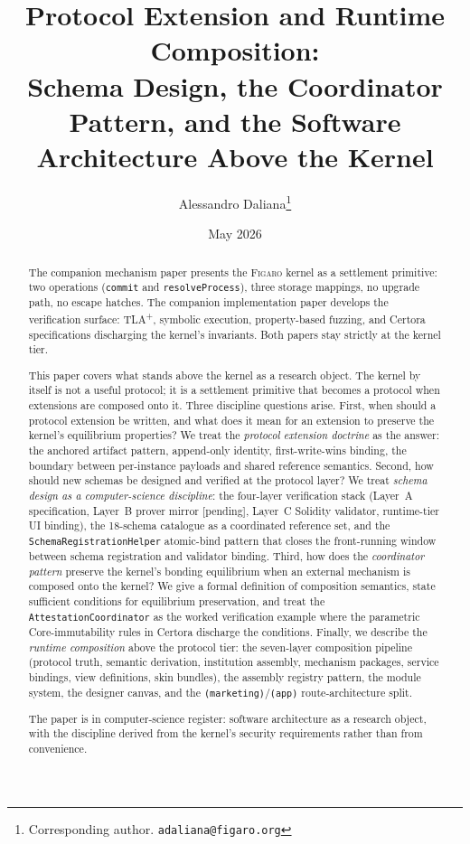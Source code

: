 \documentclass[11pt,a4paper]{article}
\title{%
  Protocol Extension and Runtime Composition:\\
  Schema Design, the Coordinator Pattern, and the Software Architecture
  Above the Kernel%
}
\author{
  Alessandro Daliana\thanks{Corresponding author. \texttt{adaliana@figaro.org}}
}
\date{May 2026}
\theoremstyle{definition}
\theoremstyle{remark}
\newcommand{\figaro}{\textsc{Figaro}}
\begin{document}
\maketitle

\begin{abstract}
The companion mechanism paper presents the \figaro{} kernel as a
settlement primitive: two operations (\texttt{commit} and
\texttt{resolveProcess}), three storage mappings, no upgrade path, no
escape hatches. The companion implementation paper develops the
verification surface: TLA\textsuperscript{+}, symbolic execution,
property-based fuzzing, and Certora specifications discharging the
kernel's invariants. Both papers stay strictly at the kernel tier.

This paper covers what stands above the kernel as a research object.
The kernel by itself is not a useful protocol; it is a settlement
primitive that becomes a protocol when extensions are composed onto
it. Three discipline questions arise. First, when should a protocol
extension be written, and what does it mean for an extension to
preserve the kernel's equilibrium properties? We treat the
\emph{protocol extension doctrine} as the answer: the anchored
artifact pattern, append-only identity, first-write-wins binding,
the boundary between per-instance payloads and shared reference
semantics. Second, how should new schemas be designed and verified
at the protocol layer? We treat \emph{schema design as a computer-science
discipline}: the four-layer verification stack (Layer~A
specification, Layer~B prover mirror [pending], Layer~C Solidity
validator, runtime-tier UI binding), the 18-schema catalogue as a
coordinated reference set, and the \texttt{SchemaRegistrationHelper}
atomic-bind pattern that closes the front-running window between
schema registration and validator binding. Third, how does the
\emph{coordinator pattern} preserve the kernel's bonding equilibrium
when an external mechanism is composed onto the kernel? We give a
formal definition of composition semantics, state sufficient
conditions for equilibrium preservation, and treat the
\texttt{AttestationCoordinator} as the worked verification example
where the parametric Core-immutability rules in Certora discharge
the conditions. Finally, we describe the \emph{runtime composition}
above the protocol tier: the seven-layer composition pipeline
(protocol truth, semantic derivation, institution assembly,
mechanism packages, service bindings, view definitions, skin
bundles), the assembly registry pattern, the module system, the
designer canvas, and the
\texttt{(marketing)}/\texttt{(app)} route-architecture split.

The paper is in computer-science register: software architecture as
a research object, with the discipline derived from the kernel's
security requirements rather than from convenience.
\end{abstract}
\end{document}
